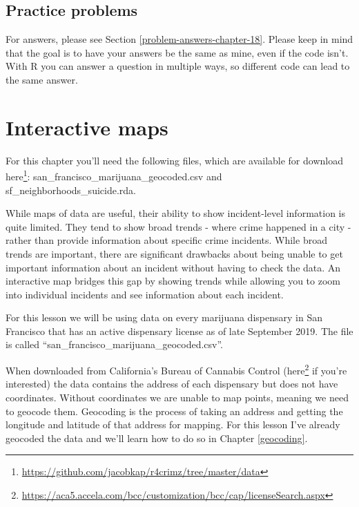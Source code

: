 \documentclass[
]{krantz}
\renewcommand{\href}[2]{#2\footnote{\url{#1}}}
\begin{document}
\hypertarget{practice-problems-11}{%
\section{Practice problems}\label{practice-problems-11}}

For answers, please see Section \ref{problem-answers-chapter-18}. Please keep in mind that the goal is to have your answers be the same as mine, even if the code isn't. With R you can answer a question in multiple ways, so different code can lead to the same answer.

\hypertarget{interactive-maps}{%
\chapter{Interactive maps}\label{interactive-maps}}

For this chapter you'll need the following files, which are available for download \href{https://github.com/jacobkap/r4crimz/tree/master/data}{here}: san\_francisco\_marijuana\_geocoded.csv and sf\_neighborhoods\_suicide.rda.

While maps of data are useful, their ability to show incident-level information is quite limited. They tend to show broad trends - where crime happened in a city - rather than provide information about specific crime incidents. While broad trends are important, there are significant drawbacks about being unable to get important information about an incident without having to check the data. An interactive map bridges this gap by showing trends while allowing you to zoom into individual incidents and see information about each incident.

For this lesson we will be using data on every marijuana dispensary in San Francisco that has an active dispensary license as of late September 2019. The file is called ``san\_francisco\_marijuana\_geocoded.csv''.

When downloaded from California's Bureau of Cannabis Control (\href{https://aca5.accela.com/bcc/customization/bcc/cap/licenseSearch.aspx}{here} if you're interested) the data contains the address of each dispensary but does not have coordinates. Without coordinates we are unable to map points, meaning we need to
geocode them. Geocoding is the process of taking an address and getting the longitude and latitude of that address for mapping. For this lesson I've already geocoded the data and we'll learn how to do so in Chapter \ref{geocoding}.
\end{document}
